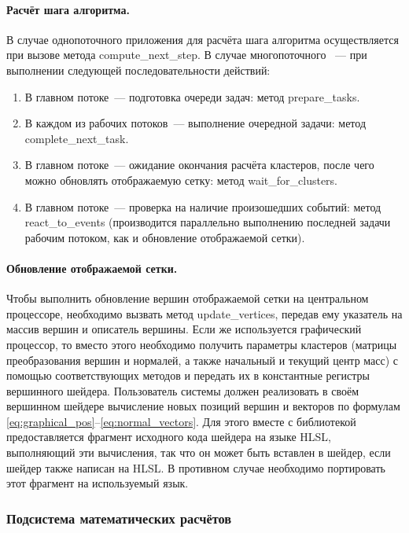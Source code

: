 \documentclass[a4paper, 14pt, titlepage]{extarticle}
\begin{document}
        \paragraph{Расчёт шага алгоритма.}
        В случае однопоточного приложения для расчёта шага алгоритма осуществляется при вызове метода
        compute\_next\_step. В случае многопоточного ~--- при выполнении следующей
        последовательности действий:
        \begin{enumerate}
          \item В главном потоке~--- подготовка очереди задач: метод prepare\_tasks.
          \item В каждом из рабочих потоков~--- выполнение очередной задачи: метод complete\_next\_task.
          \item В главном потоке~--- ожидание окончания расчёта кластеров, после чего можно
            обновлять отображаемую сетку: метод wait\_for\_clusters.
          \item В главном потоке~--- проверка на наличие произошедших событий: метод
            react\_to\_events (производится параллельно выполнению последней задачи рабочим потоком,
            как и обновление отображаемой сетки).
        \end{enumerate}

        \paragraph{Обновление отображаемой сетки.}
        Чтобы выполнить обновление вершин отображаемой сетки на центральном процессоре, необходимо вызвать метод
        update\_vertices, передав ему указатель на массив вершин и описатель вершины.
        Если же используется графический процессор, то вместо этого необходимо
        получить параметры кластеров (матрицы преобразования вершин и нормалей, а также начальный и
        текущий центр масс) с помощью соответствующих методов и передать их в константные регистры
        вершинного шейдера. Пользователь системы должен реализовать в своём вершинном шейдере
        вычисление новых позиций вершин и векторов по формулам \eqref{eq:graphical_pos}--\eqref{eq:normal_vectors}.
        Для этого вместе с библиотекой предоставляется фрагмент исходного кода шейдера на языке HLSL,
        выполняющий эти вычисления, так что он может быть вставлен в шейдер, если шейдер также написан
        на HLSL. В противном случае необходимо портировать этот фрагмент на используемый язык.

      \subsubsection{Подсистема математических расчётов}\label{sssec:math}
\end{document}
